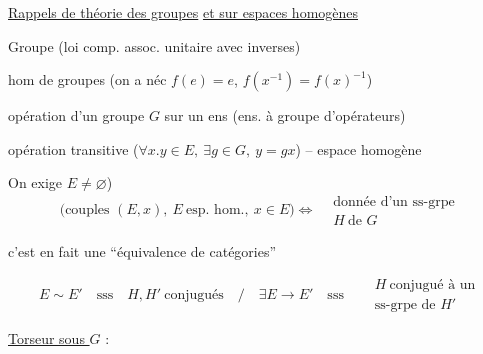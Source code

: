 \uline{Rappels de théorie des groupes} \uline{et sur espaces homogènes}

Groupe (loi comp. assoc. unitaire avec inverses)

hom de groupes (on a néc $f(e)=e$, $f(x^{-1})=f(x)^{-1}$)

opération d'un groupe $G$ sur un ens (ens. à groupe d'opérateurs)

opération transitive ($\forall x\mathord{.}y\in E,\ \exists g\in G,\ y=gx$) -- espace homogène

On exige  $E\ne\varnothing$)
\[
\bigl(\text{couples }(E,x),\ E\ \text{esp. hom.},\ x\in E\bigr)
\Longleftrightarrow
\begin{aligned}&\text{donnée d'un ss-grpe}\\&H\ \text{de }G\end{aligned}
\]

c'est en fait une ``équivalence de catégories''

{\small
{}}
{\small
\[
E\sim E'\quad\text{sss}\quad H,H'\ \text{conjugués}\quad\big/\quad
\exists E\to E'\quad\text{sss}\quad
\begin{aligned}&H\ \text{conjugué à un}\\[-2pt]&\text{ss-grpe de }H'\end{aligned}
\]}

\uline{Torseur sous $G$} :
{\small
{}}

